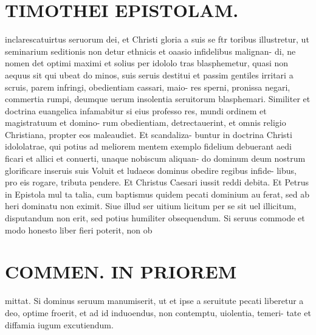 \documentclass{article}
\begin{document}
\begin{pages}
\section*{TIMOTHEI EPISTOLAM. }
\marginpar{[ p.153 ]}\pstart inclarescatuirtus seruorum dei, et Christi gloria a suis se ftr toribus illustretur, ut seminarium seditionis non detur ethnicis et oaasio infidelibus malignan- di, ne nomen det optimi maximi et solius per idololo tras blasphemetur, quasi non aequus sit qui ubeat do minos, suis seruis destitui et passim gentiles irritari a scruis, parem infringi, obedientiam cassari, maio- res sperni, pronissa negari, commertia rumpi, deumque  uerum insolentia seruitorum blasphemari. Similiter et doctrina euangelica infamabitur si eius professo res, mundi ordinem et magistratuum et domino- rum obedientiam, detrectauerint, et omnis religio Christiana, propter eos maleaudiet. Et scandaliza- buntur in doctrina Christi idololatrae, qui potius ad meliorem mentem exemplo fidelium debuerant aedi ficari et allici et conuerti, unaque nobiscum aliquan- do dominum deum nostrum glorificare inseruis suis Voluit et ludaeos dominus obedire regibus infide- libus, pro eis rogare, tributa pendere. Et Christus Caesari iussit reddi debita. Et Petrus in Epistola mul ta talia, cum baptismus quidem pecati dominium au ferat, sed ab heri dominatu non eximit. Siue illud ser uitium licitum per se sit uel illicitum, disputandum non erit, sed potius humiliter obsequendum. Si seruus commode et modo honesto liber fieri poterit, non ob  \pend
\section*{COMMEN. IN PRIOREM }
\marginpar{[ p.154 ]}\pstart mittat. Si dominus seruum manumiserit, ut et ipse a seruitute pecati liberetur a deo, optime froerit, et ad id induoendus, non contemptu, uiolentia, temeri- tate et diffamia iugum excutiendum.  \pend
{}
{}

\end{pages}
\end{document}
